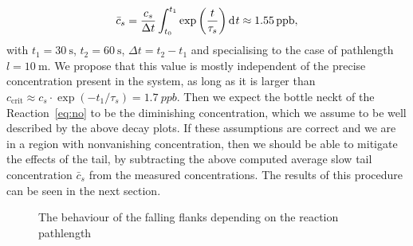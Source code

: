 \begin{align*}
  \bar c_s = \frac{c_s}{\Delta t} \int_{t_0}^{t_1}
  \exp\left(\frac{t}{\tau_s}\right)\d[t] \approx \SI{1.55}{ppb},
\end{align*}
with $t_1 = \SI{30}{\second}$, $t_2 = \SI{60}{\second}$, $\Delta t =
t_2 - t_1$ and specialising to the case of pathlength $l =
\SI{10}{\meter}$. We propose that this value is mostly independent of
the precise  concentration present in the system, as long as it
is larger than $c_{\text{crit}} \approx c_s\cdot \exp(-t_1/\tau_s) =
\SI{1.7}{ppb}$. Then we expect the bottle neckt of the
Reaction~\eqref{eq:no} to be the diminishing  concentration,
which we assume to be well described by the above decay plots. If
these assumptions are correct and we are in a region with nonvanishing
 concentration, then we should be able to mitigate the effects
of the tail, by subtracting the above computed average slow tail
concentration $\bar c_s$ from the measured 
concentrations. The results of this procedure can be seen in the next
section.
\begin{figure}[htbp]
  \centering
  
  \caption{The behaviour of the falling flanks depending on the
    reaction pathlength}
  \label{fig:switch-pl}
\end{figure}


